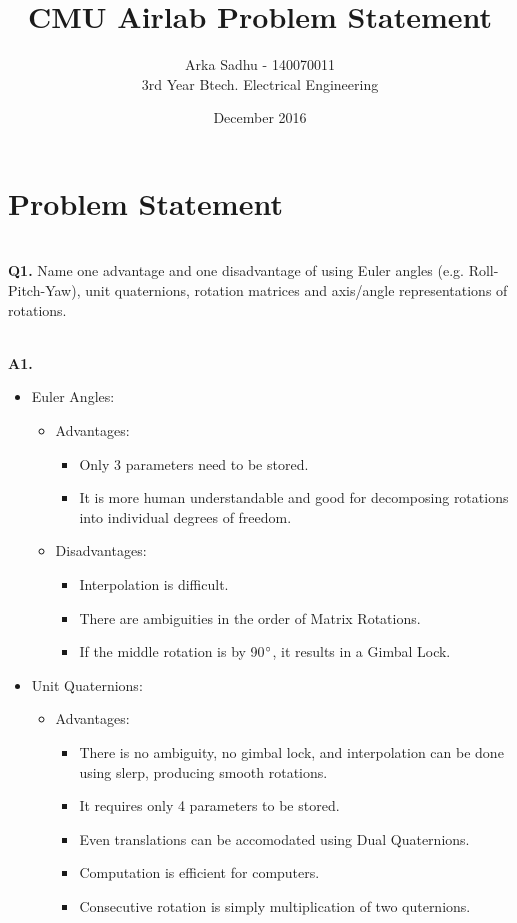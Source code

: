 \message{ !name(cmu_airlab_report.tex)}\documentclass{article}
\title{CMU Airlab Problem Statement}
\author
{
  Arka Sadhu - 140070011\\
  3rd Year Btech. Electrical Engineering
}
\date{December 2016}
\newcommand\Problem[1]{
  \\
  \textbf{Q#1.}
}
\newcommand\Sol[1]{
  \\
  \textbf{A#1.}
}
\begin{document}

\maketitle

\section*{Problem Statement}
\Problem{1} Name one advantage and one disadvantage of using Euler angles (e.g. Roll-Pitch-Yaw), unit quaternions, rotation matrices and axis/angle representations of rotations.
\Sol{1}
\begin{itemize}
\item Euler Angles:
  \begin{itemize}
  \item Advantages:

    \begin{itemize}
    \item Only 3 parameters need to be stored.
    \item It is more human understandable and good for decomposing rotations into individual degrees of freedom.
    \end{itemize}

  \item Disadvantages:
    \begin{itemize}
    \item Interpolation is difficult.
    \item There are ambiguities in the order of Matrix Rotations.
    \item If the middle rotation is by 90$\degree$, it results in a Gimbal Lock.
    \end{itemize}
  \end{itemize}
  
\item Unit Quaternions:
  \begin{itemize}
  \item Advantages:
    \begin{itemize}
    \item There is no ambiguity, no gimbal lock, and interpolation can be done using slerp, producing smooth rotations.
    \item It requires only 4 parameters to be stored.
    \item Even translations can be accomodated using Dual Quaternions.
    \item Computation is efficient for computers.
    \item Consecutive rotation is simply multiplication of two quternions.
    \end{itemize}


\end{itemize}
\end{itemize}
\end{document}
